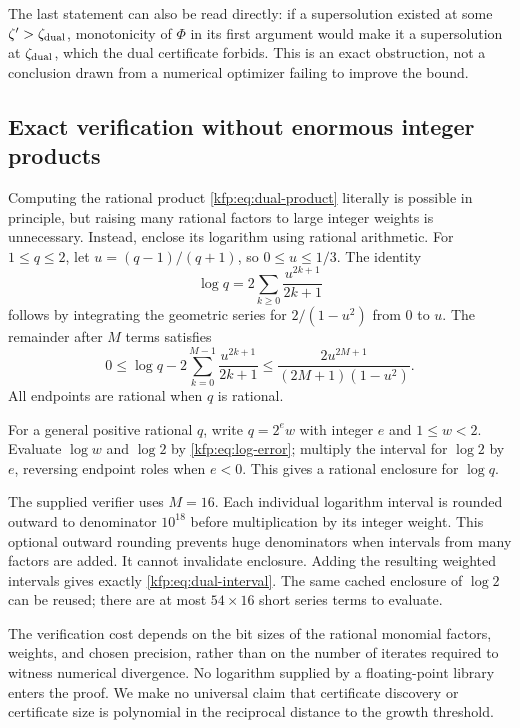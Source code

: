 \documentclass[11pt,a4paper]{article}
\theoremstyle{definition}
\theoremstyle{remark}
\begin{document}
The last statement can also be read directly: if a supersolution existed at
some $\zeta'>\zeta_{\rm dual}$, monotonicity of $\Phi$ in its first argument
would make it a supersolution at $\zeta_{\rm dual}$, which the dual
certificate forbids. This is an exact obstruction, not a conclusion drawn
from a numerical optimizer failing to improve the bound.

\subsection{Exact verification without enormous integer products}
Computing the rational product \eqref{kfp:eq:dual-product} literally is possible
in principle, but raising many rational factors to large integer weights is
unnecessary. Instead, enclose its logarithm using rational arithmetic.
For $1\leq q\leq2$, let $u=(q-1)/(q+1)$, so $0\leq u\leq1/3$. The identity
\[
 \log q=2\sum_{k\geq0}\frac{u^{2k+1}}{2k+1}
\]
follows by integrating the geometric series for $2/(1-u^2)$ from $0$ to $u$.
The remainder after $M$ terms satisfies
\begin{equation}\label{kfp:eq:log-error}
 0\leq \log q-2\sum_{k=0}^{M-1}\frac{u^{2k+1}}{2k+1}
 \leq\frac{2u^{2M+1}}{(2M+1)(1-u^2)}.
\end{equation}
All endpoints are rational when $q$ is rational.

For a general positive rational $q$, write $q=2^e w$ with integer $e$ and
$1\leq w<2$. Evaluate $\log w$ and $\log2$ by
\eqref{kfp:eq:log-error}; multiply the interval for $\log2$ by $e$, reversing
endpoint roles when $e<0$. This gives a rational enclosure for $\log q$.

The supplied verifier uses $M=16$. Each individual logarithm interval is
rounded outward to denominator $10^{18}$ before multiplication by its
integer weight. This optional outward rounding prevents huge denominators
when intervals from many factors are added. It cannot invalidate enclosure.
Adding the resulting weighted intervals gives exactly
\eqref{kfp:eq:dual-interval}. The same cached enclosure of $\log2$ can be reused;
there are at most $54\times16$ short series terms to evaluate.

The verification cost depends on the bit sizes of the rational monomial
factors, weights, and chosen precision, rather than on the number of iterates
required to witness numerical divergence. No logarithm supplied by a
floating-point library enters the proof. We make no universal claim that
certificate discovery or certificate size is polynomial in the reciprocal
distance to the growth threshold.
\end{document}
